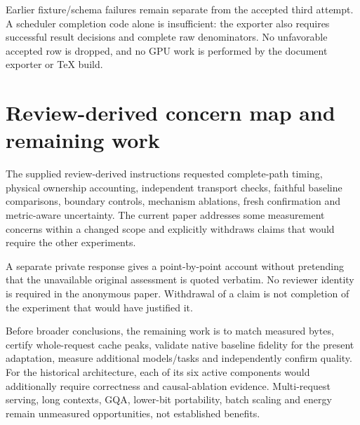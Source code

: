\documentclass{article}
\begin{document}
Earlier fixture/schema failures remain separate from the accepted third
attempt. A scheduler completion code alone is insufficient: the exporter
also requires successful result decisions and complete raw denominators.
No unfavorable accepted row is dropped, and no GPU work is performed by
the document exporter or TeX build.

\section{Review-derived concern map and remaining work}
The supplied review-derived instructions requested complete-path timing,
physical ownership accounting, independent transport checks, faithful
baseline comparisons, boundary controls, mechanism ablations, fresh
confirmation and metric-aware uncertainty. The current paper addresses
some measurement concerns within a changed scope and explicitly withdraws
claims that would require the other experiments.

A separate private response gives a point-by-point account without
pretending that the unavailable original assessment is quoted verbatim.
No reviewer identity is required in the anonymous paper. Withdrawal of a
claim is not completion of the experiment that would have justified it.

Before broader conclusions, the remaining work is to match measured bytes,
certify whole-request cache peaks, validate native baseline fidelity for
the present adaptation, measure additional models/tasks and independently
confirm quality. For the historical architecture, each of its six active
components would additionally require correctness and causal-ablation
evidence. Multi-request serving, long contexts, GQA, lower-bit portability,
batch scaling and energy remain unmeasured opportunities, not established
benefits.

\clearpage


\end{document}
